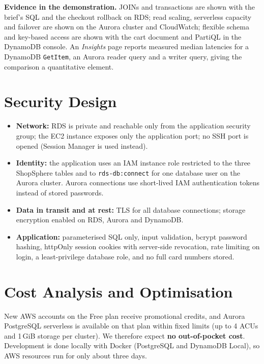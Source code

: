 \documentclass[11pt,a4paper]{article}
\begin{document}
\textbf{Evidence in the demonstration.} JOINs and transactions are shown with the brief's SQL and the checkout rollback on RDS; read scaling, serverless capacity and failover are shown on the Aurora cluster and CloudWatch; flexible schema and key-based access are shown with the cart document and PartiQL in the DynamoDB console. An \emph{Insights} page reports measured median latencies for a DynamoDB \texttt{GetItem}, an Aurora reader query and a writer query, giving the comparison a quantitative element.

\section{Security Design}
\begin{itemize}
  \item \textbf{Network:} RDS is private and reachable only from the application security group; the EC2 instance exposes only the application port; no SSH port is opened (Session Manager is used instead).
  \item \textbf{Identity:} the application uses an IAM instance role restricted to the three ShopSphere tables and to \texttt{rds-db:connect} for one database user on the Aurora cluster. Aurora connections use short-lived IAM authentication tokens instead of stored passwords.
  \item \textbf{Data in transit and at rest:} TLS for all database connections; storage encryption enabled on RDS, Aurora and DynamoDB.
  \item \textbf{Application:} parameterised SQL only, input validation, bcrypt password hashing, httpOnly session cookies with server-side revocation, rate limiting on login, a least-privilege database role, and no full card numbers stored.
\end{itemize}

\section{Cost Analysis and Optimisation}
New AWS accounts on the Free plan receive promotional credits, and Aurora PostgreSQL serverless is available on that plan within fixed limits (up to 4 ACUs and 1\,GiB storage per cluster). We therefore expect \textbf{no out-of-pocket cost}. Development is done locally with Docker (PostgreSQL and DynamoDB Local), so AWS resources run for only about three days.
\end{document}
